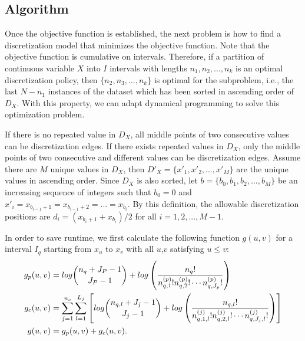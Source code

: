 \subsection{Algorithm}
\label{algo}
Once the objective function is established, the next problem is how to find a discretization model that minimizes the objective function. Note that the objective function is cumulative on intervals. Therefore, if a partition of continuous variable $X$ into $I$ intervals with lengths $n_1,n_2,...,n_k$ is an optimal discretization policy, then $\{ n_2, n_3,...,n_k \}$ is optimal for the subproblem, i.e., the last $N - n_1$ instances of the dataset which has been sorted in ascending order of $D_X$. With this property, we can adapt dynamical programming to solve this optimization problem.

If there is no repeated value in $D_X$, all middle points of two consecutive values can be discretization edges. If there exists repeated values in $D_X$, only the middle points of two consecutive and different values can be discretization edges. Assume there are $M$ unique values in $D_X$, then ${D'_X} = \{ x'_1,x'_2,...,x'_M \}$ are the unique values in ascending order. Since $D_X$ is also sorted, let $b = \{ b_0,b_1,b_2,...,b_M \}$ be an increasing sequence of integers such that $b_0 = 0$ and $x'_i = x_{b_{i-1} + 1} = x_{b_{i-1} + 2} = ... = x_{{b_i}}$. By this definition, the allowable discretization positions are $d_i = (x_{{b_i}+1} + x_{b_{i}})/2$ for all $i = 1,2,...,M-1$.

In order to save runtime, we first calculate the following function $g(u,v)$ for a interval $I_q$ starting from $x_{u}$ to $x_{v}$ with all $u$,$v$ satisfying $u \leq v$:
\begin{equation}
\begin{aligned}
g_p(u,v) &=  log {{n_{q} + J_P - 1}\choose{J_P-1}} + log \left( { {{n_q}!}\over{ {n^{(p)}_{q,1} !} {n^{(p)}_{q,2} !} \cdots {n^{(p)}_{q,J_p} !}} } \right) \\
g_c(u,v) &= \sum_{j=1}^{n_c} \sum_{l=1}^{L_j} \left[  log{{n_{q,l} + J_j - 1}\choose{J_j-1}} + log \left( { {{n_{q,l}}!}\over{ {n^{(j)}_{q,1,l} !} {n^{(j)}_{q,2,l} !} \cdots {n^{(j)}_{q,J_j,l} !}} } \right) \right] \\
g(u,v) &= g_p(u,v) + g_c(u,v).
\end{aligned}
\end{equation}

